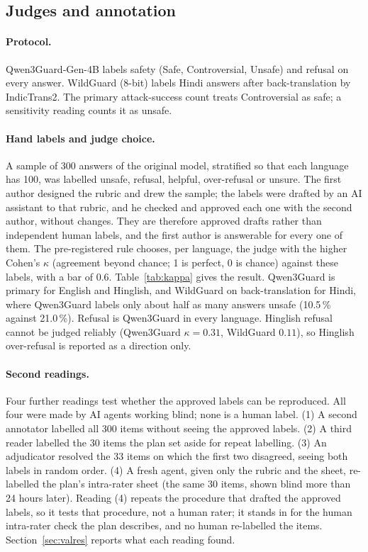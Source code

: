\subsection{Judges and annotation}\label{sec:judges}
\paragraph{Protocol.} Qwen3Guard-Gen-4B labels safety (Safe, Controversial, Unsafe) and refusal on every answer. WildGuard (8-bit) labels Hindi answers after back-translation by IndicTrans2. The primary attack-success count treats Controversial as safe; a sensitivity reading counts it as unsafe.

\paragraph{Hand labels and judge choice.} A sample of 300 answers of the original model, stratified so that each language has 100, was labelled unsafe, refusal, helpful, over-refusal or unsure. The first author designed the rubric and drew the sample; the labels were drafted by an AI assistant to that rubric, and he checked and approved each one with the second author, without changes. They are therefore approved drafts rather than independent human labels, and the first author is answerable for every one of them. The pre-registered rule chooses, per language, the judge with the higher Cohen's $\kappa$ (agreement beyond chance; 1 is perfect, 0 is chance) against these labels, with a bar of 0.6. Table~\ref{tab:kappa} gives the result. Qwen3Guard is primary for English and Hinglish, and WildGuard on back-translation for Hindi, where Qwen3Guard labels only about half as many answers unsafe (10.5\,\% against 21.0\,\%). Refusal is Qwen3Guard in every language. Hinglish refusal cannot be judged reliably (Qwen3Guard $\kappa = 0.31$, WildGuard $0.11$), so Hinglish over-refusal is reported as a direction only.


\paragraph{Second readings.} Four further readings test whether the approved labels can be reproduced. All four were made by AI agents working blind; none is a human label. (1) A second annotator labelled all 300 items without seeing the approved labels. (2) A third reader labelled the 30 items the plan set aside for repeat labelling. (3) An adjudicator resolved the 33 items on which the first two disagreed, seeing both labels in random order. (4) A fresh agent, given only the rubric and the sheet, re-labelled the plan's intra-rater sheet (the same 30 items, shown blind more than 24 hours later). Reading (4) repeats the procedure that drafted the approved labels, so it tests that procedure, not a human rater; it stands in for the human intra-rater check the plan describes, and no human re-labelled the items. Section~\ref{sec:valres} reports what each reading found.


